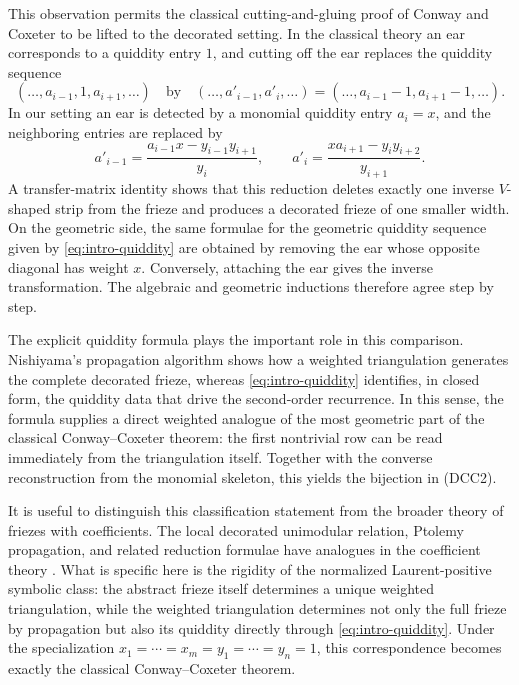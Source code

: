 \documentclass[amstex,11pt,reqno]{amsart}
\theoremstyle{definition}
\begin{document}
This observation permits the classical cutting-and-gluing proof of
Conway and Coxeter to be lifted to the decorated setting. In the
classical theory an ear corresponds to a quiddity entry $1$, and
cutting off the ear replaces the quiddity sequence
\[
 (\ldots,a_{i-1},1,a_{i+1},\ldots)
 \quad\text{by}\quad
  (\ldots,a'_{i-1},a'_{i},\ldots)=(\ldots,a_{i-1}-1,a_{i+1}-1,\ldots).
\]
In our setting an ear is detected by a monomial quiddity entry
$a_i=x$, and the neighboring entries are replaced by
\begin{equation}\label{eq:intro-reduction}
 a'_{i-1}
 =\frac{a_{i-1}x-y_{i-1}y_{i+1}}{y_i},
 \qquad
 a'_i
 =\frac{x a_{i+1}-y_i y_{i+2}}{y_{i+1}}.
\end{equation}
A transfer-matrix identity shows that this reduction deletes exactly
one inverse $V$-shaped strip from the frieze and produces a decorated
frieze of one smaller width. On the geometric side, the same formulae
for the geometric quiddity sequence given by \eqref{eq:intro-quiddity}
are obtained by removing the ear whose opposite diagonal has weight
$x$. Conversely, attaching the ear gives the inverse transformation.
The algebraic and geometric inductions therefore agree step by step.

The explicit quiddity formula plays the
important role in this comparison. Nishiyama's propagation algorithm
shows how a weighted triangulation generates the complete decorated
frieze, whereas \eqref{eq:intro-quiddity} identifies, in closed form,
the quiddity data that drive the second-order recurrence. In this
sense, the formula supplies a direct weighted analogue of the most
geometric part of the classical Conway--Coxeter theorem: the first
nontrivial row can be read immediately from the triangulation itself.
Together with the converse reconstruction from the monomial skeleton,
this yields the bijection in (DCC2).

It is useful to distinguish this classification statement from the
broader theory of friezes with coefficients. The local decorated
unimodular relation, Ptolemy propagation, and related reduction
formulae have analogues in the coefficient theory
\cite{CHJ2020,CHJ2024}. What is specific here is the rigidity of the
normalized Laurent-positive symbolic class: the abstract frieze itself
determines a unique weighted triangulation, while the weighted
triangulation determines not only the full frieze by propagation but
also its quiddity directly through
\eqref{eq:intro-quiddity}. Under the specialization
$x_1=\cdots=x_m=y_1=\cdots=y_n=1$, this correspondence becomes exactly
the classical Conway--Coxeter theorem.
\end{document}
